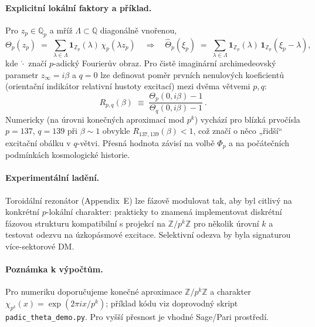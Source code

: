\paragraph{Explicitní lokální faktory a příklad.}
Pro $z_p\!\in\!\mathbb{Q}_p$ a mříž $\Lambda\!\subset\!\mathbb{Q}$ diagonálně vnořenou,
\begin{equation}
\Theta_p(z_p) \;=\; \sum_{\lambda\in\Lambda} \mathbf{1}_{\mathbb{Z}_p}(\lambda)\,\chi_p(\lambda z_p)
\quad\Rightarrow\quad
\widehat{\Theta}_p(\xi_p) \;=\; \sum_{\lambda\in\Lambda} \mathbf{1}_{\mathbb{Z}_p}(\lambda)\,\mathbf{1}_{\mathbb{Z}_p}(\xi_p-\lambda),
\end{equation}
kde $\widehat{\cdot}$ značí $p$-adický Fourierův obraz. Pro čistě imaginární archimedeovský parametr $z_\infty=i\beta$ a $q=0$ lze definovat
poměr prvních nenulových koeficientů (orientační indikátor relativní hustoty excitací) mezi dvěma větvemi $p,q$:
\begin{equation}
R_{p,q}(\beta) \;\equiv\; \frac{\Theta_p(0,i\beta)-1}{\Theta_q(0,i\beta)-1}\,.
\end{equation}
Numericky (na úrovni konečných aproximací mod $p^k$) vychází pro blízká prvočísla $p=137$, $q=139$ při $\beta\!\sim\!1$ obvykle $R_{137,139}(\beta)<1$,
což značí o něco „řidší“ excitační obálku v $q$-větvi. Přesná hodnota závisí na volbě $\Phi_p$ a na počátečních podmínkách kosmologické historie.

\paragraph{Experimentální ladění.}
Toroidální rezonátor (Appendix~E) lze fázově modulovat tak, aby byl citlivý na konkrétní $p$-lokální charakter: prakticky to znamená implementovat
diskrétní fázovou strukturu kompatibilní s projekcí na $\mathbb{Z}/p^k\mathbb{Z}$ pro několik úrovní $k$ a testovat odezvu na úzkopásmové excitace.
Selektivní odezva by byla signaturou více-sektorové DM.

\paragraph{Poznámka k výpočtům.}
Pro numeriku doporučujeme konečné aproximace $\mathbb{Z}/p^k\mathbb{Z}$ a charakter $\chi_{p^k}(x)=\exp(2\pi i x/p^k)$; příklad kódu viz doprovodný skript
\texttt{padic\_theta\_demo.py}. Pro vyšší přesnost je vhodné Sage/Pari prostředí.
